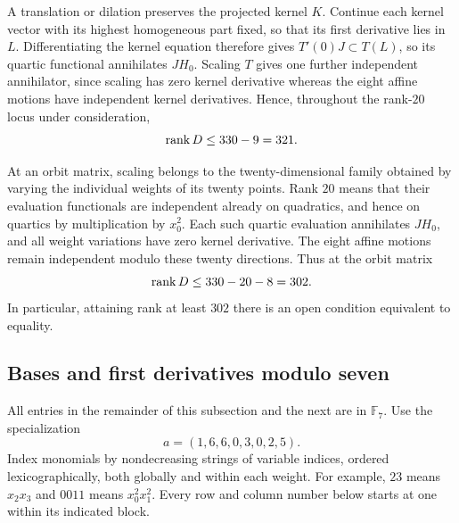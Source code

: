A translation or dilation preserves the projected kernel $K$.
Continue each kernel vector with its highest homogeneous part
fixed, so that its first derivative lies in $L$.  Differentiating
the kernel equation therefore gives
$T'(0)J\subset T(L)$, so its quartic functional annihilates $JH_0$.
Scaling $T$ gives one further independent annihilator, since scaling
has zero kernel derivative whereas the eight affine motions have
independent kernel derivatives.  Hence, throughout the rank-$20$
locus under consideration,
\begin{equation}
 \operatorname{rank} D\le330-9=321.
 \label{eq:certificate-upper-321}
\end{equation}

At an orbit matrix, scaling belongs to the twenty-dimensional family
obtained by varying the individual weights of its twenty points.
Rank $20$ means
that their evaluation functionals are independent already on
quadratics, and hence on quartics by multiplication by $x_0^2$.
Each such quartic evaluation annihilates $JH_0$, and all weight
variations have zero kernel derivative.  The eight affine motions
remain independent modulo these twenty directions.  Thus at the
orbit matrix
\begin{equation}
 \operatorname{rank} D\le330-20-8=302.
 \label{eq:certificate-upper-302}
\end{equation}
In particular, attaining rank at least $302$ there is an open condition
equivalent to equality.

\subsection{Bases and first derivatives modulo seven}
\label{subsec:certificate-bases}

All entries in the remainder of this subsection and the next are in
$\mathbb F_7$.  Use the specialization
\begin{equation}
 a=(1,6,6,0,3,0,2,5).
 \label{eq:certificate-point}
\end{equation}
Index monomials by nondecreasing strings of variable indices, ordered
lexicographically, both globally and within each weight.  For example,
$23$ means $x_2x_3$ and $0011$ means $x_0^2x_1^2$.
Every row and column number below starts at one within its indicated
block.

